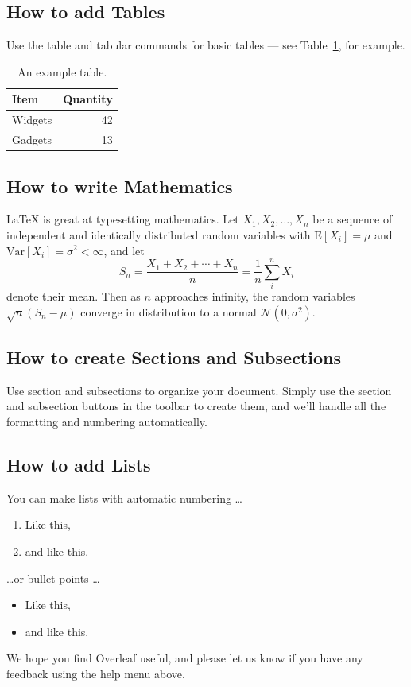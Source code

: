 \documentclass[a4paper]{article}
\begin{document}

\subsection{How to add Tables}

Use the table and tabular commands for basic tables --- see Table~\ref{tab:widgets}, for example. 

\begin{table}
\centering
\begin{tabular}{l|r}
Item & Quantity \\\hline
Widgets & 42 \\
Gadgets & 13
\end{tabular}
\caption{\label{tab:widgets}An example table.}
\end{table}

\subsection{How to write Mathematics}

\LaTeX{} is great at typesetting mathematics. Let $X_1, X_2, \ldots, X_n$ be a sequence of independent and identically distributed random variables with $\text{E}[X_i] = \mu$ and $\text{Var}[X_i] = \sigma^2 < \infty$, and let
\[S_n = \frac{X_1 + X_2 + \cdots + X_n}{n}
      = \frac{1}{n}\sum_{i}^{n} X_i\]
denote their mean. Then as $n$ approaches infinity, the random variables $\sqrt{n}(S_n - \mu)$ converge in distribution to a normal $\mathcal{N}(0, \sigma^2)$.


\subsection{How to create Sections and Subsections}

Use section and subsections to organize your document. Simply use the section and subsection buttons in the toolbar to create them, and we'll handle all the formatting and numbering automatically.

\subsection{How to add Lists}

You can make lists with automatic numbering \dots

\begin{enumerate}
\item Like this,
\item and like this.
\end{enumerate}
\dots or bullet points \dots
\begin{itemize}
\item Like this,
\item and like this.
\end{itemize}

We hope you find Overleaf useful, and please let us know if you have any feedback using the help menu above.
\end{document}

